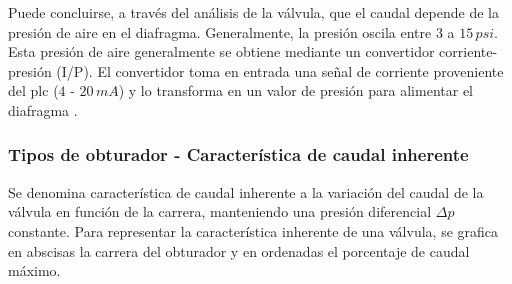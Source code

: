 Puede concluirse, a través del análisis de la válvula, que el caudal depende de
la presión de aire en el diafragma.
Generalmente, la presión oscila entre $3$ a $15\,psi$.
Esta presión de aire generalmente se obtiene mediante un convertidor
corriente-presión (I/P).
El convertidor toma en entrada una señal de corriente proveniente del \gls{plc}
($4$ - $20\,mA$) y lo transforma en un valor de presión para alimentar el
diafragma \cite{bib:ApuntesPuglesiValvulas}.

\subsubsection{Tipos de obturador - Característica de caudal inherente}
Se denomina característica de caudal inherente a la variación del caudal de
la válvula en función de la carrera, manteniendo una presión diferencial
$\Delta p$ constante.
Para representar la característica inherente de una válvula, se grafica en
abscisas la carrera del obturador y en ordenadas el porcentaje de caudal máximo.

